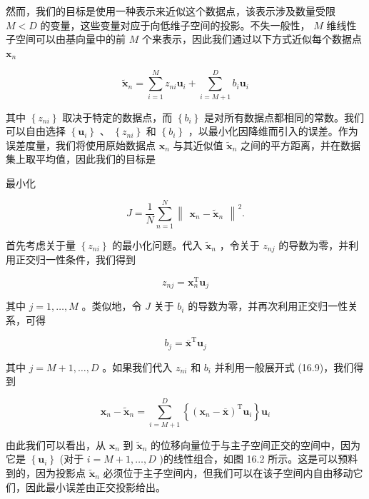 \documentclass[10pt]{report}
\begin{document}
然而，我们的目标是使用一种表示来近似这个数据点，该表示涉及数量受限 \(M < D\) 的变量，这些变量对应于向低维子空间的投影。不失一般性， \(M\) 维线性子空间可以由基向量中的前 \(M\) 个来表示，因此我们通过以下方式近似每个数据点 \({\mathbf{x}}_{n}\)

\[
{\widetilde{\mathbf{x}}}_{n} = \mathop{\sum }\limits_{{i = 1}}^{M}{z}_{ni}{\mathbf{u}}_{i} + \mathop{\sum }\limits_{{i = M + 1}}^{D}{b}_{i}{\mathbf{u}}_{i} \tag{16.10}
\]

其中 \(\left\{  {z}_{ni}\right\}\) 取决于特定的数据点，而 \(\left\{  {b}_{i}\right\}\) 是对所有数据点都相同的常数。我们可以自由选择 \(\left\{  {\mathbf{u}}_{i}\right\}\) 、 \(\left\{  {z}_{ni}\right\}\) 和 \(\left\{  {b}_{i}\right\}\) ，以最小化因降维而引入的误差。作为误差度量，我们将使用原始数据点 \({\mathbf{x}}_{n}\) 与其近似值 \({\widetilde{\mathbf{x}}}_{n}\) 之间的平方距离，并在数据集上取平均值，因此我们的目标是

最小化

\[
J = \frac{1}{N}\mathop{\sum }\limits_{{n = 1}}^{N}{\begin{Vmatrix}{\mathbf{x}}_{n} - {\widetilde{\mathbf{x}}}_{n}\end{Vmatrix}}^{2}. \tag{16.11}
\]

首先考虑关于量 \(\left\{  {z}_{ni}\right\}\) 的最小化问题。代入 \({\widetilde{\mathbf{x}}}_{n}\) ，令关于 \({z}_{nj}\) 的导数为零，并利用正交归一性条件，我们得到

\[
{z}_{nj} = {\mathbf{x}}_{n}^{\mathrm{T}}{\mathbf{u}}_{j} \tag{16.12}
\]

其中 \(j = 1,\ldots ,M\) 。类似地，令 \(J\) 关于 \({b}_{i}\) 的导数为零，并再次利用正交归一性关系，可得

\[
{b}_{j} = {\overline{\mathbf{x}}}^{\mathrm{T}}{\mathbf{u}}_{j} \tag{16.13}
\]

其中 \(j = M + 1,\ldots ,D\) 。如果我们代入 \({z}_{ni}\) 和 \({b}_{i}\) 并利用一般展开式 (16.9)，我们得到

\[
{\mathbf{x}}_{n} - {\widetilde{\mathbf{x}}}_{n} = \mathop{\sum }\limits_{{i = M + 1}}^{D}\left\{  {{\left( {\mathbf{x}}_{n} - \overline{\mathbf{x}}\right) }^{\mathrm{T}}{\mathbf{u}}_{i}}\right\}  {\mathbf{u}}_{i} \tag{16.14}
\]

由此我们可以看出，从 \({\mathbf{x}}_{n}\) 到 \({\widetilde{\mathbf{x}}}_{n}\) 的位移向量位于与主子空间正交的空间中，因为它是 \(\left\{  {\mathbf{u}}_{i}\right\}\) (对于 \(i = M + 1,\ldots ,D\) )的线性组合，如图 16.2 所示。这是可以预料到的，因为投影点 \({\widetilde{\mathbf{x}}}_{n}\) 必须位于主子空间内，但我们可以在该子空间内自由移动它们，因此最小误差由正交投影给出。
\end{document}
